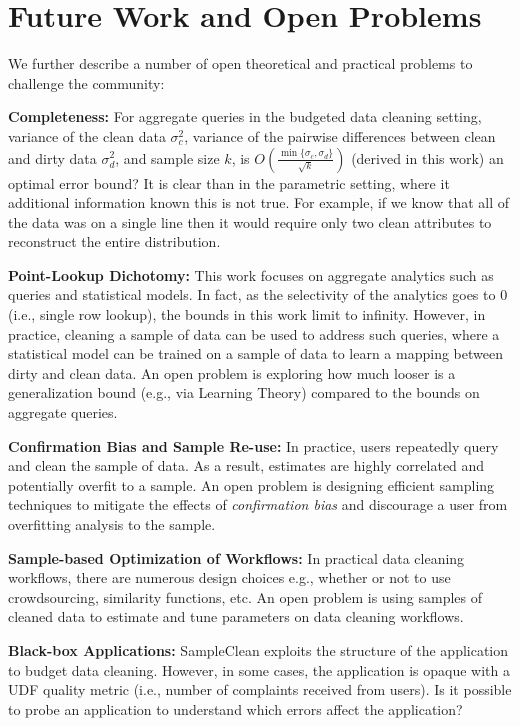 \section{Future Work and Open Problems}
We further describe a number of open theoretical and practical problems to challenge the community:

\vspace{0.5em}
\noindent \textbf{Completeness: } For aggregate queries in the budgeted data cleaning setting,
variance of the clean data $\sigma_c^2$, variance of the pairwise differences between clean and dirty data $\sigma_d^2$, and sample size $k$, is $O(\frac{\min \{\sigma_c,\sigma_d\}}{\sqrt{k}})$ (derived in this work) an optimal error bound?
It is clear than in the parametric setting, where it additional information known this is not true. For example, if we know that all of the data was on a single line then it would require only two clean attributes to reconstruct the entire distribution. 

\vspace{0.5em}
\noindent \textbf{Point-Lookup Dichotomy: } This work focuses on aggregate analytics such as queries and statistical models. In fact, as the selectivity of the analytics goes to 0 (i.e., single row lookup), the bounds in this work limit to infinity. However, in practice, cleaning a sample of data can be used to address such queries, where a statistical model can be trained on a sample of data to learn a mapping between dirty and clean data. An open problem is exploring how much looser is a generalization bound (e.g., via Learning Theory) compared to the bounds on aggregate queries.

\vspace{0.5em}
\noindent \textbf{Confirmation Bias and Sample Re-use: } In practice, users repeatedly query and clean the sample of data. As a result, estimates are highly correlated and potentially overfit to a sample. An open problem is designing efficient sampling techniques to mitigate the effects of \emph{confirmation bias} and discourage a user from overfitting analysis to the sample.

\vspace{0.5em}
\noindent \textbf{Sample-based Optimization of Workflows: } In practical data cleaning workflows, there are numerous design choices e.g., whether or not to use crowdsourcing, similarity functions, etc. An open problem is using samples of cleaned data to estimate and tune parameters on data cleaning workflows.

\vspace{0.5em}
\noindent \textbf{Black-box Applications: } SampleClean exploits the structure of the application to budget data cleaning. However, in some cases, the application is opaque with a UDF quality metric (i.e., number of complaints received from users). Is it possible to probe an application to understand which errors affect the application?


